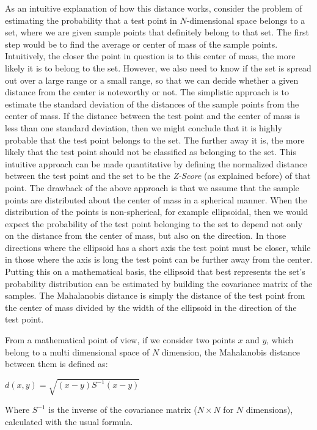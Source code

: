 \documentclass[12pt,a4paper,cucitura]{toptesi}
\begin{document}
As an intuitive explanation of how this distance works, consider the problem of estimating the probability that a test point in $N$-dimensional space belongs to a set, where we are given sample points that definitely belong to that set.
The first step would be to find the average or center of mass of the sample points.
Intuitively, the closer the point in question is to this center of mass, the more likely it is to belong to the set.
However, we also need to know if the set is spread out over a large range or a small range, so that we can decide whether a given distance from the center is noteworthy or not.
The simplistic approach is to estimate the standard deviation of the distances of the sample points from the center of mass.
If the distance between the test point and the center of mass is less than one standard deviation, then we might conclude that it is highly probable that the test point belongs to the set.
The further away it is, the more likely that the test point should not be classified as belonging to the set.
This intuitive approach can be made quantitative by defining the normalized distance between the test point and the set to be the \emph{Z-Score} (as explained before) of that point.
The drawback of the above approach is that we assume that the sample points are distributed about the center of mass in a spherical manner.
When the distribution of the points is non-spherical, for example ellipsoidal, then we would expect the probability of the test point belonging to the set to depend not only on the distance from the center of mass, but also on the direction.
In those directions where the ellipsoid has a short axis the test point must be closer, while in those where the axis is long the test point can be further away from the center.
Putting this on a mathematical basis, the ellipsoid that best represents the set's probability distribution can be estimated by building the covariance matrix of the samples.
The Mahalanobis distance is simply the distance of the test point from the center of mass divided by the width of the ellipsoid in the direction of the test point.

From a mathematical point of view, if we consider two points $x$ and $y$, which belong to a multi dimensional space of $N$ dimension, the Mahalanobis distance between them is defined as:

\begin{center}
\Large
$d(x,y) = \sqrt{(x - y)S^{-1}(x - y)}$
\end{center}

Where $S^{-1}$ is the inverse of the covariance matrix ($N \times N$ for $N$ dimensions), calculated with the usual formula.
\end{document}
